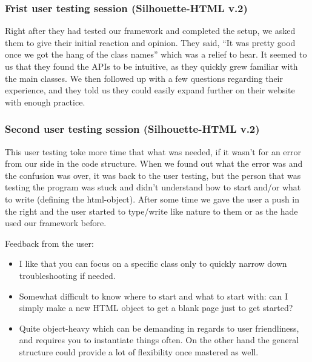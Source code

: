 \documentclass[12pt]{article}
\begin{document}
        \subsubsection{Frist user testing session (Silhouette-HTML v.2)}
        Right after they had tested our framework and completed the setup, we asked them to give their initial reaction and opinion. They said, “It was pretty good once we got the hang of the class names” which was a relief to hear. It seemed to us that they found the APIs to be intuitive, as they quickly grew familiar with the main classes. We then followed up with a few questions regarding their experience, and they told us they could easily expand further on their website with enough practice.

        \subsubsection{Second user testing session (Silhouette-HTML v.2)}
        This user testing toke more time that what was needed, if it wasn’t for an error from our side in the code structure. When we found out what the error was and the confusion was over, it was back to the user testing, but the person that was testing the program was stuck and didn’t understand how to start and/or what to write (defining the html-object). After some time we gave the user a push in the right and the user started to type/write like nature to them or as the hade used our framework before.

        Feedback from the user:
        \begin{itemize}
            \item I like that you can focus on a specific class only to quickly narrow down troubleshooting if needed.
            \item Somewhat difficult to know where to start and what to start with: can I simply make a new HTML object to get a blank page just to get started?
            \item Quite object-heavy which can be demanding in regards to user friendliness, and requires you to instantiate things often. On the other hand the general structure could provide a lot of flexibility once mastered as well.
        \end{itemize}
\end{document}
